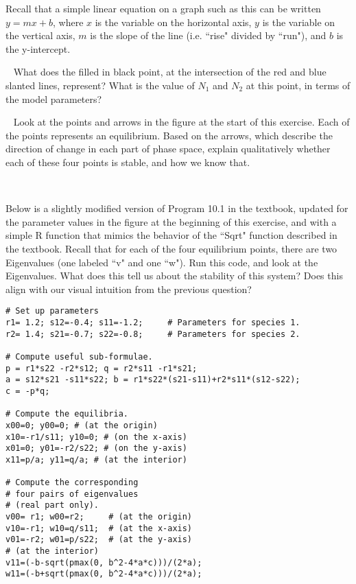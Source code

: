 \documentclass[12pt]{article}
\begin{document}
Recall that a simple linear equation on a graph such as this can be written $y = mx + b$, where $x$ is the variable on the horizontal axis, $y$ is the variable on the vertical axis, $m$ is the slope of the line (i.e. ``rise" divided by ``run"), and $b$ is the y-intercept. 

~\newline
{}
\newline
What does the filled in black point, at the intersection of the red and blue slanted lines, represent? What is the value of $N_1$ and $N_2$ at this point, in terms of the model parameters?

~\newline
{}
\newline
Look at the points and arrows in the figure at the start of this exercise. Each of the points represents an equilibrium. Based on the arrows, which describe the direction of change in each part of phase space, explain qualitatively whether each of these four points is stable, and how we know that. 

~\newline

\newline
Below is a slightly modified version of Program 10.1 in the textbook, updated for the parameter values in the figure at the beginning of this exercise, and with a simple R function that mimics the behavior of the ``Sqrt" function described in the textbook. Recall that for each of the four equilibrium points, there are two Eigenvalues (one labeled ``v" and one ``w"). Run this code, and look at the Eigenvalues. What does this tell us about the stability of this system? Does this align with our visual intuition from the previous question?

\begin{verbatim}
# Set up parameters
r1= 1.2; s12=-0.4; s11=-1.2;     # Parameters for species 1.
r2= 1.4; s21=-0.7; s22=-0.8;     # Parameters for species 2.

# Compute useful sub-formulae.
p = r1*s22 -r2*s12; q = r2*s11 -r1*s21; 
a = s12*s21 -s11*s22; b = r1*s22*(s21-s11)+r2*s11*(s12-s22);
c = -p*q;

# Compute the equilibria.
x00=0; y00=0; # (at the origin)
x10=-r1/s11; y10=0; # (on the x-axis)
x01=0; y01=-r2/s22; # (on the y-axis)
x11=p/a; y11=q/a; # (at the interior)

# Compute the corresponding
# four pairs of eigenvalues
# (real part only).
v00= r1; w00=r2;     # (at the origin)
v10=-r1; w10=q/s11;  # (at the x-axis)
v01=-r2; w01=p/s22;  # (at the y-axis)
# (at the interior)
v11=(-b-sqrt(pmax(0, b^2-4*a*c)))/(2*a);
w11=(-b+sqrt(pmax(0, b^2-4*a*c)))/(2*a);
\end{verbatim}
\end{document}
